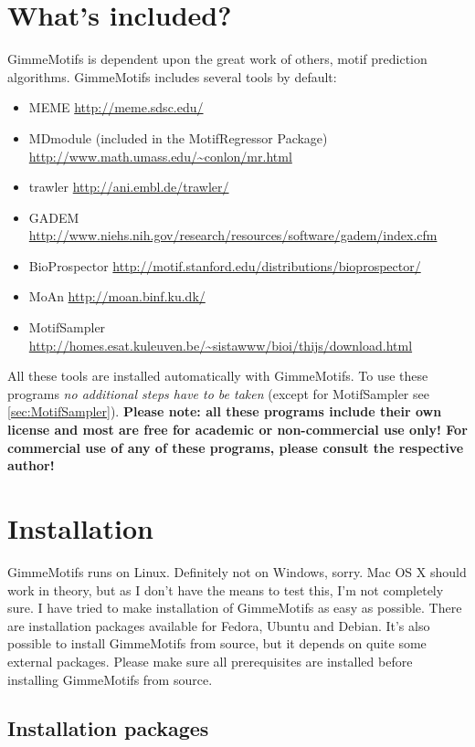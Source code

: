 \documentclass[11pt]{article}
\begin{document}
\section{What's included?}
GimmeMotifs is dependent upon the great work of others, motif prediction algorithms. GimmeMotifs includes several tools by default:
\begin{itemize}
\item MEME \cite{bailey_meme_2009} \url{http://meme.sdsc.edu/}
\item MDmodule \cite{liu_algorithm_2002} (included in the MotifRegressor
Package) \url{http://www.math.umass.edu/~conlon/mr.html}
\item trawler \cite{ettwiller_trawler:_2007} \url{http://ani.embl.de/trawler/}
\item GADEM \cite{li_gadem:genetic_2009} \url{http://www.niehs.nih.gov/research/resources/software/gadem/index.cfm}
\item BioProspector \cite{liu_bioprospector:_2001} \url{http://motif.stanford.edu/distributions/bioprospector/}
\item MoAn \cite{valen_discovery_2009} \url{http://moan.binf.ku.dk/}
\item MotifSampler \cite{thijs_higher-order_2001,thijs_gibbs_2002} \url{http://homes.esat.kuleuven.be/~sistawww/bioi/thijs/download.html}
\end{itemize}
All these tools are installed automatically with GimmeMotifs. To use these programs \emph{no additional steps have to be taken} (except for MotifSampler see \ref{sec:MotifSampler}). \textbf{Please note: all these programs include their own license and most are free for academic or non-commercial use only! For commercial use of any of these programs, please consult the respective author!}

\section{Installation}
GimmeMotifs runs on Linux. Definitely not on Windows, sorry. Mac OS X should work in theory, but as I don't have the means to test this, I'm not completely sure. I have tried to make installation of GimmeMotifs as easy as possible. There are installation packages available for Fedora, Ubuntu and Debian. It's also possible to install GimmeMotifs from source, but it depends on quite some external packages. Please make sure all prerequisites are installed before installing GimmeMotifs from source. 

\subsection{Installation packages}
\end{document}
